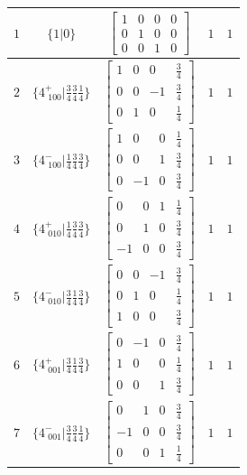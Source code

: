 \documentclass[fleqn,8pt]{jsarticle}
\begin{document}
\begin{longtable}{ccccc}
$ 1 $ & $ \{1|0\} $ & $ \begin{bmatrix} 1 & 0 & 0 & 0 \\ 0 & 1 & 0 & 0 \\ 0 & 0 & 1 & 0 \end{bmatrix} $ & $ 1 $ & $ 1 $ \\ \hline
$ 2 $ & $ \{4^{+}_{\,\,100}|\frac{3}{4} \frac{3}{4} \frac{1}{4}\} $ & $ \begin{bmatrix} 1 & 0 & 0 & \frac{3}{4} \\ 0 & 0 & -1 & \frac{3}{4} \\ 0 & 1 & 0 & \frac{1}{4} \end{bmatrix} $ & $ 1 $ & $ 1 $ \\ \hline
$ 3 $ & $ \{4^{-}_{\,\,100}|\frac{1}{4} \frac{3}{4} \frac{3}{4}\} $ & $ \begin{bmatrix} 1 & 0 & 0 & \frac{1}{4} \\ 0 & 0 & 1 & \frac{3}{4} \\ 0 & -1 & 0 & \frac{3}{4} \end{bmatrix} $ & $ 1 $ & $ 1 $ \\ \hline
$ 4 $ & $ \{4^{+}_{\,\,010}|\frac{1}{4} \frac{3}{4} \frac{3}{4}\} $ & $ \begin{bmatrix} 0 & 0 & 1 & \frac{1}{4} \\ 0 & 1 & 0 & \frac{3}{4} \\ -1 & 0 & 0 & \frac{3}{4} \end{bmatrix} $ & $ 1 $ & $ 1 $ \\ \hline
$ 5 $ & $ \{4^{-}_{\,\,010}|\frac{3}{4} \frac{1}{4} \frac{3}{4}\} $ & $ \begin{bmatrix} 0 & 0 & -1 & \frac{3}{4} \\ 0 & 1 & 0 & \frac{1}{4} \\ 1 & 0 & 0 & \frac{3}{4} \end{bmatrix} $ & $ 1 $ & $ 1 $ \\ \hline
$ 6 $ & $ \{4^{+}_{\,\,001}|\frac{3}{4} \frac{1}{4} \frac{3}{4}\} $ & $ \begin{bmatrix} 0 & -1 & 0 & \frac{3}{4} \\ 1 & 0 & 0 & \frac{1}{4} \\ 0 & 0 & 1 & \frac{3}{4} \end{bmatrix} $ & $ 1 $ & $ 1 $ \\ \hline
$ 7 $ & $ \{4^{-}_{\,\,001}|\frac{3}{4} \frac{3}{4} \frac{1}{4}\} $ & $ \begin{bmatrix} 0 & 1 & 0 & \frac{3}{4} \\ -1 & 0 & 0 & \frac{3}{4} \\ 0 & 0 & 1 & \frac{1}{4} \end{bmatrix} $ & $ 1 $ & $ 1 $ \\ \hline

\end{longtable}
\end{document}
